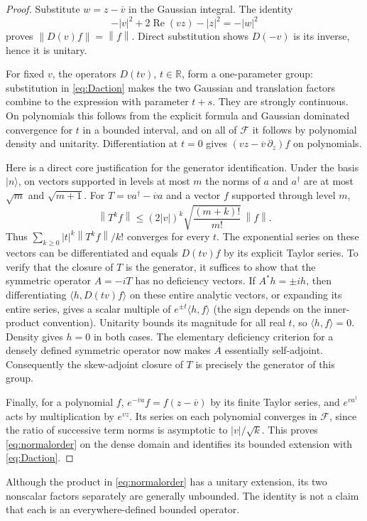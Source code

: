 \documentclass[11pt]{article}
\theoremstyle{definition}
\theoremstyle{remark}
\newcommand{\R}{\mathbb R}
\newcommand{\norm}[1]{\left\lVert #1\right\rVert}
\numberwithin{equation}{section}
\begin{document}
\begin{proof}
Substitute $w=z-\overline v$ in the Gaussian integral. The identity
\[
 -|v|^2+2\operatorname{Re}(vz)-|z|^2=-|w|^2
\]
proves $\norm{D(v)f}=\norm f$. Direct substitution shows $D(-v)$ is its inverse, hence it is unitary.

For fixed $v$, the operators $D(tv)$, $t\in\R$, form a one-parameter group: substitution in \eqref{eq:Daction} makes the two Gaussian and translation factors combine to the expression with parameter $t+s$. They are strongly continuous. On polynomials this follows from the explicit formula and Gaussian dominated convergence for $t$ in a bounded interval, and on all of $\mathcal F$ it follows by polynomial density and unitarity. Differentiation at $t=0$ gives $(vz-\overline v\,\partial_z)f$ on polynomials.

Here is a direct core justification for the generator identification. Under the basis $|n\rangle$, on vectors supported in levels at most $m$ the norms of $a$ and $a^\dagger$ are at most $\sqrt m$ and $\sqrt{m+1}$. For $T=va^\dagger-\overline v a$ and a vector $f$ supported through level $m$,
\begin{equation}\label{eq:analyticvectorbound}
 \norm{T^kf}\leq (2|v|)^k\sqrt{\frac{(m+k)!}{m!}}\,\norm f.
\end{equation}
Thus $\sum_{k\geq0}|t|^k\norm{T^kf}/k!$ converges for every $t$. The exponential series on these vectors can be differentiated and equals $D(tv)f$ by its explicit Taylor series. To verify that the closure of $T$ is the generator, it suffices to show that the symmetric operator $A=-iT$ has no deficiency vectors. If $A^*h=\pm ih$, then differentiating $\langle h,D(tv)f\rangle$ on these entire analytic vectors, or expanding its entire series, gives a scalar multiple of $e^{\pm t}\langle h,f\rangle$ (the sign depends on the inner-product convention). Unitarity bounds its magnitude for all real $t$, so $\langle h,f\rangle=0$. Density gives $h=0$ in both cases. The elementary deficiency criterion for a densely defined symmetric operator now makes $A$ essentially self-adjoint. Consequently the skew-adjoint closure of $T$ is precisely the generator of this group.

Finally, for a polynomial $f$, $e^{-\overline v a}f=f(z-\overline v)$ by its finite Taylor series, and $e^{va^\dagger}$ acts by multiplication by $e^{vz}$. Its series on each polynomial converges in $\mathcal F$, since the ratio of successive term norms is asymptotic to $|v|/\sqrt k$. This proves \eqref{eq:normalorder} on the dense domain and identifies its bounded extension with \eqref{eq:Daction}.
\end{proof}
Although the product in \eqref{eq:normalorder} has a unitary extension, its two nonscalar factors separately are generally unbounded. The identity is not a claim that each is an everywhere-defined bounded operator.
\end{document}
